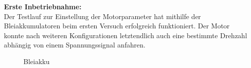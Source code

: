 \textbf{Erste Inbetriebnahme:}
\\[2mm]
Der Testlauf zur Einstellung der Motorparameter hat mithilfe der Bleiakkumulatoren beim ersten Versuch erfolgreich funktioniert. Der Motor konnte nach weiteren Konfigurationen letztendlich auch eine bestimmte Drehzahl abhängig von einem Spannungssignal anfahren. 


\begin{figure}[H]
	\begin{center}
		\caption{Bleiakku}
	\end{center}
\end{figure}

\newpage